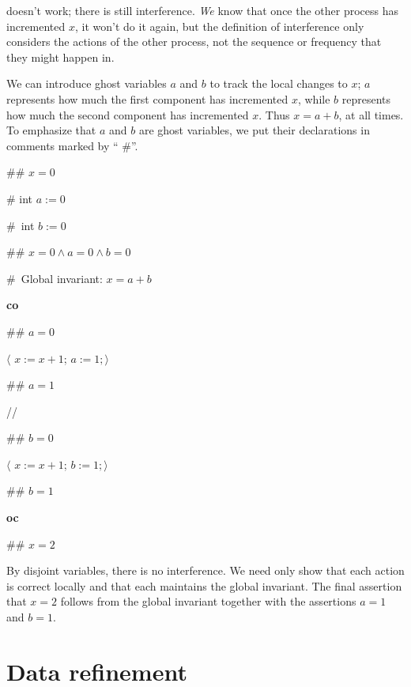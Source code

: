\documentclass[11pt]{article}%
\begin{document}
\noindent doesn't work; there is still interference. \emph{We} know that once
the other process has incremented $x$, it won't do it again, but the
definition of interference only considers the actions of the other process,
not the sequence or frequency that they might happen in.

We can introduce ghost variables $a$ and $b$ to track the local changes to
$x$; $a$ represents how much the first component has incremented $x$, while
$b$ represents how much the second component has incremented $x$. Thus
$x=a+b$, at all times. To emphasize that $a$ and $b$ are ghost variables, we
put their declarations in comments marked by \textquotedblleft%
\#\textquotedblright.

\begin{code}
\#\# $x=0$

\# int $a:=0$

\#\ int $b:=0$

\#\# $x=0\wedge a=0\wedge b=0$

\#\ Global invariant: $x=a+b$

\textbf{co}

\begin{indent}
\item \#\# $a=0$

\item $\langle$ $x:=x+1$; $a:=1;\rangle$

\item \#\# $a=1$
\end{indent}

//

\begin{indent}
\item \#\# $b=0$

\item $\langle$ $x:=x+1$; $b:=1;\rangle$

\item \#\# $b=1$
\end{indent}

\textbf{oc}

\#\# $x=2$
\end{code}

\noindent By disjoint variables, there is no interference. We need only show
that each action is correct locally and that each maintains the global
invariant. The final assertion that $x=2$ follows from the global invariant
together with the assertions $a=1$ and $b=1$.

\section{Data refinement\label{trans}}
\end{document}
